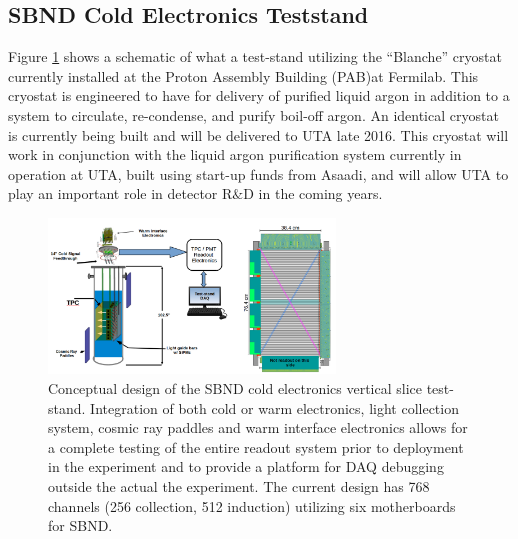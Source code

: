 \subsection{SBND Cold Electronics Teststand}\label{sec:SBNDTeststand}
Figure \ref{fig:teststand} shows a schematic of what a test-stand utilizing the ``Blanche'' cryostat currently installed at the Proton Assembly Building (PAB)at Fermilab. This cryostat is engineered to have for delivery of purified liquid argon in addition to a system to circulate, re-condense, and purify boil-off argon. An identical cryostat is currently being built and will be delivered to UTA late 2016. This cryostat will work in conjunction with the liquid argon purification system currently in operation at UTA, built using start-up funds from Asaadi, and will allow UTA to play an important role in detector R$\&$D in the coming years. 

\begin{figure}[htb]
\centering
\includegraphics[width=0.68\textwidth]{images/teststand3.png}
\caption[]{Conceptual design of the SBND cold electronics vertical slice test-stand. Integration of both cold or warm electronics, light collection system, cosmic ray paddles and warm interface electronics allows for a complete testing of the entire readout system prior to deployment in the experiment and to provide a platform for DAQ debugging outside the actual the experiment. The current design has 768 channels (256 collection, 512 induction) utilizing six motherboards for SBND.}
\label{fig:teststand}
\end{figure} 


